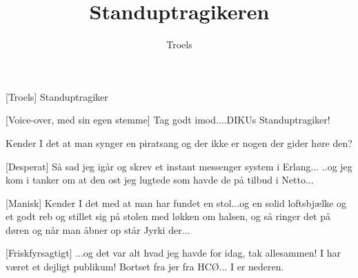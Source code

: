 \documentclass[a4paper,11pt]{article}
\title{Standuptragikeren}
\author{Troels}
\begin{document}
\maketitle

\begin{roles}
[Troels] Standuptragiker
\end{roles}

\begin{props}
\end{props}

  
\begin{sketch}


 [Voice-over, med sin egen stemme] Tag godt imod....DIKUs Standuptragiker!


 Kender I det at man synger en piratsang og der ikke er nogen der gider høre den?

[Desperat] Så sad jeg igår og skrev et instant messenger system i Erlang... ..og jeg kom i tanker om at den ost jeg lugtede som havde de på tilbud i Netto...

[Manisk] Kender I det med at man har fundet en stol...og en solid loftsbjælke og et godt reb og stillet sig på stolen med løkken om halsen, og så ringer det på døren og når man åbner op står Jyrki der...


[Friskfyrsagtigt] ...og det var alt hvad jeg havde for idag, tak allesammen! I har været et dejligt publikum! Bortset fra jer fra HCØ... I er nederen.

\end{sketch}
\end{document}
